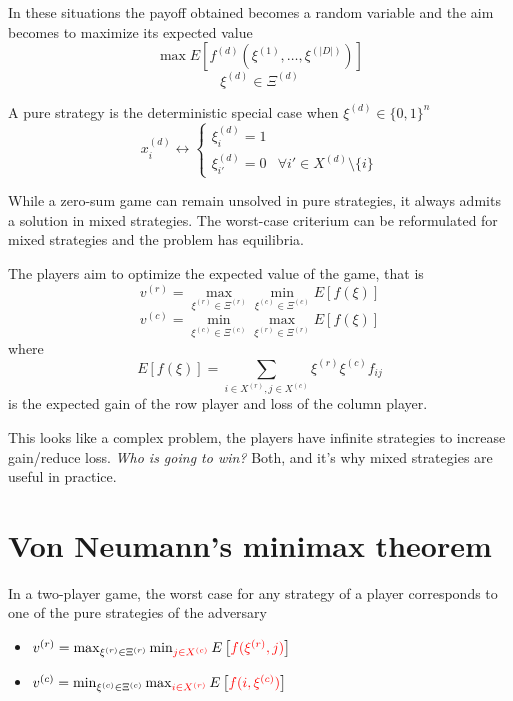 In these situations the payoff obtained becomes a random variable and the aim becomes to maximize its expected value
$$ \max E \left[f^{(d)} \left(\xi^{(1)}, \dots, \xi^{(|D|)}\right)\right]$$
$$ \xi^{(d)} \in \Xi^{(d)} $$

A pure strategy is the deterministic special case when $\xi^{(d)} \in \{0,1\}^n$
$$ x^{(d)}_i \leftrightarrow \begin{cases}
	\xi^{(d)}_i = 1 \\
	\xi^{(d)}_{i'} = 0 & \forall i' \in X^{(d)} \setminus \{i\}
\end{cases}$$

While a zero-sum game can remain unsolved in pure strategies, it always admits a solution in mixed strategies. The worst-case criterium can be reformulated for mixed strategies and the problem has equilibria.

The players aim to optimize the expected value of the game, that is
$$ v^{(r)} = \max_{\xi^{(r)} \in \Xi^{(r)}} \min_{\xi^{(c)} \in \Xi^{(c)}} E \left[f(\xi)\right] $$
$$ v^{(c)} = \min_{\xi^{(c)} \in \Xi^{(c)}} \max_{\xi^{(r)} \in \Xi^{(r)}} E \left[f(\xi)\right] $$
where
$$ E\left[f(\xi)\right] = \sum_{i \in X^{(r)}, j \in X^{(c)}} \xi^{(r)} \xi^{(c)} f_{ij} $$
is the expected gain of the row player and loss of the column player.

This looks like a complex problem, the players have infinite strategies to increase gain/reduce loss. \textit{Who is going to win?} Both, and it's why mixed strategies are useful in practice.

\section{Von Neumann's minimax theorem}

\begin{lemma}
	In a two-player game, the worst case for any strategy of a player corresponds to one of the pure strategies of the adversary
	\begin{itemize}
		\item $v^{(r)} = \max_{\xi^{(r)} \in \Xi^{(r)}} \min_{{\color{red} j \in X^{(c)}}} E \left[ {\color{red} f(\xi^{(r)}, j)} \right]$
		
		\item $v^{(c)} = \min_{\xi^{(c)} \in \Xi^{(c)}} \max_{{\color{red} i \in X^{(r)}}} E \left[ {\color{red} f(i, \xi^{(c)})}\right] $
	\end{itemize}
\end{lemma}

